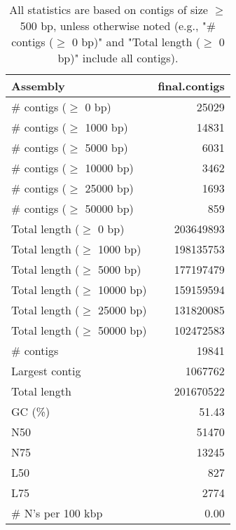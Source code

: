 \documentclass[12pt,a4paper]{article}
\begin{document}
\begin{table}[ht]
\begin{center}
\caption{All statistics are based on contigs of size $\geq$ 500 bp, unless otherwise noted (e.g., "\# contigs ($\geq$ 0 bp)" and "Total length ($\geq$ 0 bp)" include all contigs).}
\begin{tabular}{|l*{1}{|r}|}
\hline
Assembly & final.contigs \\ \hline
\# contigs ($\geq$ 0 bp) & 25029 \\ \hline
\# contigs ($\geq$ 1000 bp) & 14831 \\ \hline
\# contigs ($\geq$ 5000 bp) & 6031 \\ \hline
\# contigs ($\geq$ 10000 bp) & 3462 \\ \hline
\# contigs ($\geq$ 25000 bp) & 1693 \\ \hline
\# contigs ($\geq$ 50000 bp) & 859 \\ \hline
Total length ($\geq$ 0 bp) & 203649893 \\ \hline
Total length ($\geq$ 1000 bp) & 198135753 \\ \hline
Total length ($\geq$ 5000 bp) & 177197479 \\ \hline
Total length ($\geq$ 10000 bp) & 159159594 \\ \hline
Total length ($\geq$ 25000 bp) & 131820085 \\ \hline
Total length ($\geq$ 50000 bp) & 102472583 \\ \hline
\# contigs & 19841 \\ \hline
Largest contig & 1067762 \\ \hline
Total length & 201670522 \\ \hline
GC (\%) & 51.43 \\ \hline
N50 & 51470 \\ \hline
N75 & 13245 \\ \hline
L50 & 827 \\ \hline
L75 & 2774 \\ \hline
\# N's per 100 kbp & 0.00 \\ \hline
\end{tabular}
\end{center}
\end{table}
\end{document}
